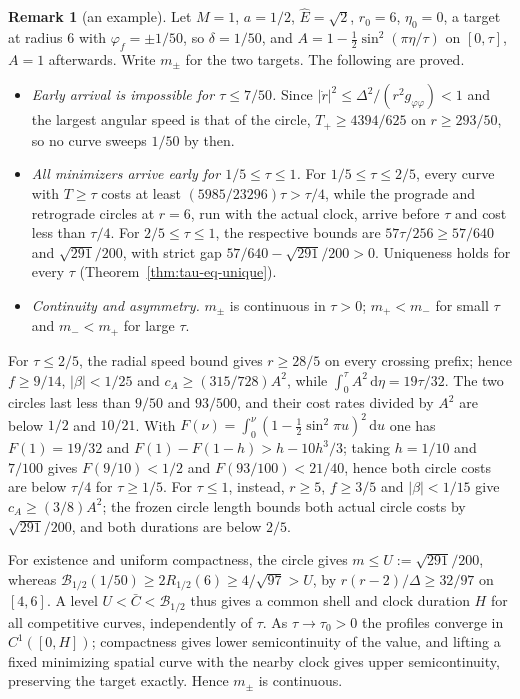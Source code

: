 \documentclass[aip,jmp,amsmath,amssymb,reprint]{revtex4-2}
\newcommand{\Ehat}{\hat E}
\newcommand{\dd}{\mathrm{d}}
\theoremstyle{plain}
\theoremstyle{definition}
\newtheorem{remark}[proposition]{Remark}
\begin{document}
\begin{remark}[an example]\label{rmk:tau-eq-example}
Let $M=1$, $a=1/2$, $\Ehat=\sqrt2$, $r_0=6$, $\eta_0=0$, a target at radius $6$ with $\varphi_f=\pm1/50$, so
$\delta=1/50$, and $A=1-\frac12\sin^2(\pi\eta/\tau)$ on $[0,\tau]$, $A=1$ afterwards. Write $m_\pm$ for the two
targets. The following are proved.
\begin{itemize}
\item \emph{Early arrival is impossible for $\tau\le7/50$.} Since $|\dot r|^2\le\Delta^2/(r^2g_{\varphi\varphi})<1$
  and the largest angular speed is that of the circle, $T_+\ge4394/625$ on $r\ge293/50$, so no curve
  sweeps $1/50$ by then.
\item \emph{All minimizers arrive early for $1/5\le\tau\le1$.} For $1/5\le\tau\le2/5$, every curve with
  $T\ge\tau$ costs at least $(5985/23296)\tau>\tau/4$, while the prograde and retrograde circles at $r=6$,
  run with the actual clock, arrive before $\tau$ and cost less than $\tau/4$. For $2/5\le\tau\le1$, the
  respective bounds are $57\tau/256\ge57/640$ and $\sqrt{291}/200$, with strict gap
  $57/640-\sqrt{291}/200>0$. Uniqueness holds for every $\tau$ (Theorem~\ref{thm:tau-eq-unique}).
\item \emph{Continuity and asymmetry.} $m_\pm$ is continuous in $\tau>0$; $m_+<m_-$ for small $\tau$ and
  $m_-<m_+$ for large $\tau$.
\end{itemize}
For $\tau\le2/5$, the radial speed bound gives $r\ge28/5$ on every crossing prefix; hence $f\ge9/14$,
$|\beta|<1/25$ and $c_A\ge(315/728)A^2$, while $\int_0^\tau A^2\,\dd\eta=19\tau/32$. The two circles last less
than $9/50$ and $93/500$, and their cost rates divided by $A^2$ are below $1/2$ and $10/21$. With
$F(\nu)=\int_0^\nu(1-\frac12\sin^2\pi u)^2\,\dd u$ one has $F(1)=19/32$ and $F(1)-F(1-h)>h-10h^3/3$; taking
$h=1/10$ and $7/100$ gives $F(9/10)<1/2$ and $F(93/100)<21/40$, hence both circle costs are below
$\tau/4$ for $\tau\ge1/5$. For $\tau\le1$, instead, $r\ge5$, $f\ge3/5$ and $|\beta|<1/15$ give $c_A\ge(3/8)A^2$;
the frozen circle length bounds both actual circle costs by $\sqrt{291}/200$, and both durations are
below $2/5$.

For existence and uniform compactness, the circle gives $m\le U:=\sqrt{291}/200$, whereas
$\mathcal B_{1/2}(1/50)\ge2R_{1/2}(6)\ge4/\sqrt{97}>U$, by $r(r-2)/\Delta\ge32/97$ on $[4,6]$. A level
$U<\bar C<\mathcal B_{1/2}$ thus gives a common shell and clock duration $H$ for all competitive curves,
independently of $\tau$. As $\tau\to\tau_0>0$ the profiles converge in $C^1([0,H])$; compactness gives
lower semicontinuity of the value, and lifting a fixed minimizing spatial curve with the nearby
clock gives upper semicontinuity, preserving the target exactly. Hence $m_\pm$ is continuous.


\end{remark}
\end{document}
